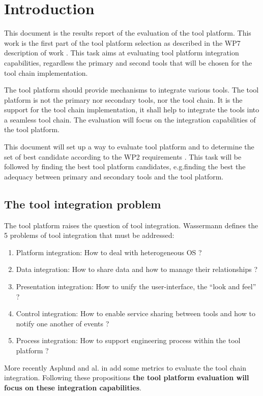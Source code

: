 \chapter{Introduction}
This document is the results report of the evaluation of the tool
platform. This work is the first part of the tool platform selection
as described in the WP7 description of work \cite{WP7_D01}.
This task aims at evaluating tool platform integration capabilities,
regardless the primary and second tools that will be chosen for the
tool chain implementation.

The tool platform should provide mechanisms to integrate various
tools. The tool platform is not the primary nor secondary tools, nor
the tool chain. It is the support for the tool chain implementation,
it shall help to integrate the tools into a seamless tool chain.
The evaluation will focus on the integration capabilities of the tool platform.

This document will set up a way to evaluate tool platform and to
determine the set of best candidate according to the WP2 requirements
\cite{baro_requirements_2013}. This task will be followed by finding
the best tool platform candidates, e.g.finding the best the adequacy
between primary and secondary tools and the tool platform.


\section{The tool integration problem}
The tool platform raises the question of tool integration.
Wassermann \cite{wasserman_tool_1990}  defines the 5 problems of tool integration that must
be addressed:
\begin{enumerate}
\item Platform integration: How to deal with heterogeneous OS ?
\item Data integration: How to share data and how to manage their
  relationships ?
\item Presentation integration: How to unify the user-interface, the ``look and feel'' ?
\item Control integration: How to enable service sharing between tools and
how to notify one another of events ?
\item Process integration: How to support engineering process within
  the tool platform ?
\end{enumerate}
More recently  Asplund and al. in \cite{asplund_tool_2011} add some
metrics to evaluate the tool chain integration. Following these
propositions {\bf the tool platform evaluation will focus on
these integration capabilities}. 

